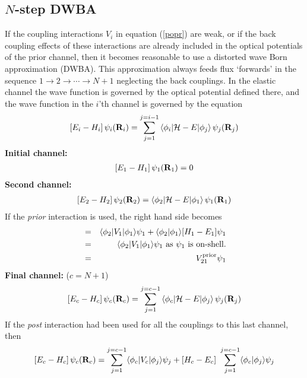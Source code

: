 \documentclass[11pt,a4paper]{article}
\newcommand{\vecR}{{\bf R}}
\begin{document}
\subsection{$N$-step DWBA}

If the coupling interactions $ V_i $ in equation (\ref{popr}) are
weak, or if the back coupling effects of these interactions are already
included in the optical potentials of the prior channel, then it becomes
reasonable to use a distorted wave Born approximation (DWBA). This
approximation always feeds flux `forwards' in the sequence $ 1
\rightarrow 2 \rightarrow \cdots \rightarrow N+1 $ neglecting the back couplings. In
the elastic channel the wave function is governed by the optical potential
defined there, and the wave function in the $i$'th channel is
governed by the equation
\begin{eqnarray}
\left [ E_i - H_i \right ]\psi_i ( \vecR_i ) =
   \sum _ {j=1} ^ {j=i-1}
         \left\langle\phi_i | {\cal H}-E |\phi_j \right\rangle
         \psi_j ( \vecR_j )
\end{eqnarray}
{\bf Initial channel:}
\begin{eqnarray} \nonumber
\left [ E_1 - H_1 \right ]\psi_1 ( \vecR_1 ) = 0
\end{eqnarray}
{\bf Second channel:}
\begin{eqnarray}
\left [ E_2 - H_2 \right ]\psi_2 ( \vecR_2 ) =
         \left\langle\phi_2 | {\cal H}-E |\phi_1 \right\rangle
         \psi_1 ( \vecR_1 )
\end{eqnarray}
If the {\em prior} interaction is used, the right hand side becomes
\begin{eqnarray}  \nonumber
    &=&\langle\phi_2 | V_1 |\phi_1\rangle\psi_1
         + \langle\phi_2 |\phi_1\rangle [H_1 - E_1 ]\psi_1 \\
    &=&\langle\phi_2 | V_1 |\phi_1\rangle\psi_1
          \mbox{ as } \psi_1 \mbox{ is on-shell.} \\
    &=& V_{21}^{\rm prior}                   \psi_1
\end{eqnarray}
{\bf Final channel: } ($c=N+1$)
\begin{eqnarray}
\left [ E_c - H_c \right ]\psi_c ( \vecR_c ) =
   \sum _ {j=1} ^{j=c-1}
         \left\langle\phi_c | {\cal H}-E |\phi_j \right\rangle
         \psi_j ( \vecR_j )
\end{eqnarray}
If the {\em post} interaction
had been used for all the couplings to this last channel, then
\begin{eqnarray}
\left [ E_c - H_c \right ]\psi_c ( \vecR_c ) =
   \sum_ {j=1} ^ {j=c-1}
          \langle\phi_c | V_c |\phi_j\rangle\psi_j
  + [H_c - E_c ]~   \sum_{j=1} ^ {j=c-1}
          \langle\phi_c |\phi_j\rangle   \psi_j
\end{eqnarray}
\end{document}
